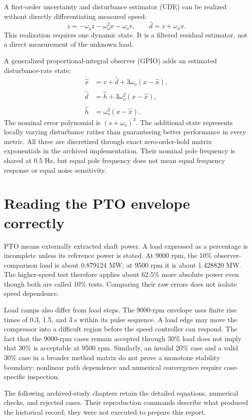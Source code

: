 A first-order uncertainty and disturbance estimator (UDE) can be realized without directly differentiating measured speed:
\begin{equation}\dot z=-\omega_o z-\omega_o^2x-\omega_o v,\qquad \hat d=z+\omega_o x.
\end{equation}
This realization requires one dynamic state. It is a filtered residual estimator, not a direct measurement of the unknown load.

A generalized proportional-integral observer (GPIO) adds an estimated disturbance-rate state:
\begin{align}\dot{\hat x}&=v+\hat d+3\omega_o(x-\hat x),\\
\dot{\hat d}&=\hat h+3\omega_o^2(x-\hat x),\\
\dot{\hat h}&=\omega_o^3(x-\hat x).
\end{align}
The nominal error polynomial is $(s+\omega_o)^3$. The additional state represents locally varying disturbance rather than guaranteeing better performance in every metric. All three are discretized through exact zero-order-hold matrix exponentials in the archived implementation. Their nominal pole frequency is shared at 0.5 Hz, but equal pole frequency does not mean equal frequency response or equal noise sensitivity.

\section{Reading the PTO envelope correctly}
PTO means externally extracted shaft power. A load expressed as a percentage is incomplete unless its reference power is stated. At 9000 rpm, the 10\% observer-comparison load is about 0.879124 MW; at 9500 rpm it is about 1.428820 MW. The higher-speed test therefore applies about 62.5\% more absolute power even though both are called 10\% tests. Comparing their raw errors does not isolate speed dependence.

Load ramps also differ from load steps. The 9000-rpm envelope uses finite rise times of 0.3, 1.5, and 3 s within its pulse sequence. A load edge may move the compressor into a difficult region before the speed controller can respond. The fact that the 9000-rpm cases remain accepted through 30\% load does not imply that 30\% is acceptable at 9500 rpm. Similarly, an invalid 20\% case and a valid 30\% case in a broader method matrix do not prove a monotone stability boundary: nonlinear path dependence and numerical convergence require case-specific inspection.

The following archived-study chapters retain the detailed equations, numerical checks, and rejected cases. Their reproduction commands describe what produced the historical record; they were not executed to prepare this report.
